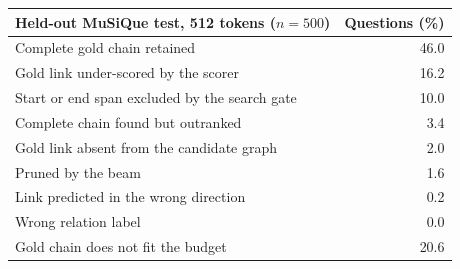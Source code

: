 \begin{tabular}{@{}lr@{}}
\toprule
Held-out MuSiQue test, 512 tokens ($n{=}500$) & Questions (\%) \\
\midrule
Complete gold chain retained & 46.0 \\
\addlinespace[2pt]
Gold link under-scored by the scorer & 16.2 \\
Start or end span excluded by the search gate & 10.0 \\
Complete chain found but outranked & 3.4 \\
Gold link absent from the candidate graph & 2.0 \\
Pruned by the beam & 1.6 \\
Link predicted in the wrong direction & 0.2 \\
Wrong relation label & 0.0 \\
\addlinespace[2pt]
Gold chain does not fit the budget & 20.6 \\
\bottomrule
\end{tabular}
